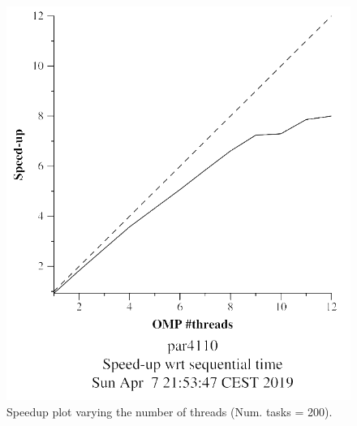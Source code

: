 \documentclass[12pt, a4paper]{article}
\begin{document}
\begin{figure}[H]
\begin{minipage}[b]{0.4\linewidth}
  \includegraphics[scale=0.5]{./mandel-omp-10000-strong-omp-24-200-speedup}
  \caption{Speedup plot varying the number of threads (Num. tasks = 200).}
  \label{fig:mandel-omp-10000-strong-omp-24-200-speedup}
\end{minipage}
\end{figure}
\end{document}

